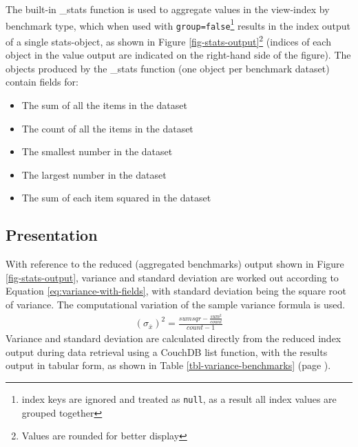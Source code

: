 The built-in \_stats function is used to aggregate values in the view-index by benchmark type, which when used with \texttt{group=false}\footnote{index keys are ignored and treated as \texttt{null}, as a result all index values are grouped together} results in the index output of a single stats-object, as shown in Figure \ref{fig-stats-output}\footnote{Values are rounded for better display} (indices of each object in the value output are indicated on the right-hand side of the figure). The objects produced by the \_stats function (one object per benchmark dataset) contain fields for:

\begin{itemize}
    \item The sum of all the items in the dataset
    \item The count of all the items in the dataset
    \item The smallest number in the dataset
    \item The largest number in the dataset
    \item The sum of each item squared in the dataset
\end{itemize}



\subsection{Presentation}
With reference to the reduced (aggregated benchmarks) output shown in Figure \ref{fig-stats-output}, variance and standard deviation are worked out according to Equation \ref{eq:variance-with-fields}, with standard deviation being the square root of variance. The computational variation of the sample variance formula is used.
\begin{align}
    (\sigma_{\overline{x}})^{2} =  \frac{sumsqr - \frac{sum^2}{count}}{count - 1}\label{eq:variance-with-fields}
\end{align}
Variance and standard deviation are calculated directly from the reduced index output during data retrieval using a CouchDB list function, with the results output in tabular form, as shown in Table \ref{tbl-variance-benchmarks} (page \pageref{tbl-variance-benchmarks}).